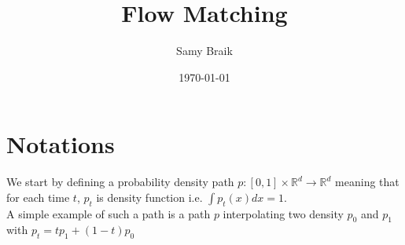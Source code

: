 \documentclass[a4paper,12pt]{article}
\title{Flow Matching}
\author{Samy Braik}
\date{\today}
\begin{document}
\maketitle

\section{Notations}
We start by defining a probability density path \(p:[0,1]\times\mathbb{R}^d\rightarrow\mathbb{R}^d\) meaning that for each time \(t\), \(p_t\) is density function i.e. \(\int p_t(x)dx=1\).\\
A simple example of such a path is a path \(p\) interpolating two density \(p_0\) and \(p_1\) with \(p_t=tp_1+(1-t)p_0\)

\end{document}
